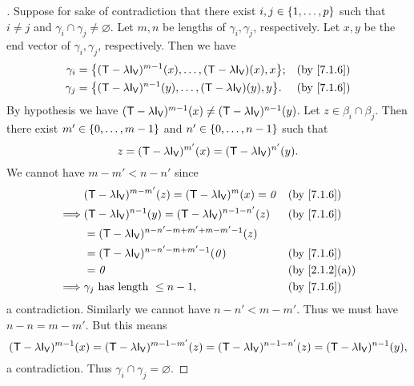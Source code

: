 \begin{proof}[]
  Suppose for sake of contradiction that there exist \(i, j \in \left\lbrace1, \dots, p\right\rbrace\) such that \(i \neq j\) and \(\gamma_i \cap \gamma_j \neq \varnothing\).
  Let \(m, n\) be lengths of \(\gamma_i, \gamma_j\), respectively.
  Let \(x, y\) be the end vector of \(\gamma_i, \gamma_j\), respectively.
  Then we have
  \begin{align*}
    \gamma_i & = \set{(\T - \lambda \IT[\V])^{m - 1}(x), \dots, (\T - \lambda \IT[\V])(x), x}; &  & \by{7.1.6} \\
    \gamma_j & = \set{(\T - \lambda \IT[\V])^{n - 1}(y), \dots, (\T - \lambda \IT[\V])(y), y}. &  & \by{7.1.6}
  \end{align*}
  By hypothesis we have \((\T - \lambda \IT[\V])^{m - 1}(x) \neq (\T - \lambda \IT[\V])^{n - 1}(y)\).
  Let \(z \in \beta_i \cap \beta_j\).
  Then there exist \(m' \in \left\lbrace0, \dots, m - 1\right\rbrace\) and \(n' \in \left\lbrace0, \dots, n - 1\right\rbrace\) such that
  \[
    z = (\T - \lambda \IT[\V])^{m'}(x) = (\T - \lambda \IT[\V])^{n'}(y).
  \]
  We cannot have \(m - m' < n - n'\) since
  \begin{align*}
             & (\T - \lambda \IT[\V])^{m - m'}(z) = (\T - \lambda \IT[\V])^m(x) = \zv     &  & \by{7.1.6}    \\
    \implies & (\T - \lambda \IT[\V])^{n - 1}(y) = (\T - \lambda \IT[\V])^{n - 1 - n'}(z) &  & \by{7.1.6}    \\
             & = (\T - \lambda \IT[\V])^{n - n' - m + m' + m - m' - 1}(z)                                    \\
             & = (\T - \lambda \IT[\V])^{n - n' - m + m' - 1}(\zv)                        &  & \by{7.1.6}    \\
             & = \zv                                                                      &  & \by{2.1.2}[a] \\
    \implies & \gamma_j \text{ has length } \leq n - 1,                                   &  & \by{7.1.6}
  \end{align*}
  a contradiction.
  Similarly we cannot have \(n - n' < m - m'\).
  Thus we must have \(n - n = m - m'\).
  But this means
  \[
    (\T - \lambda \IT[\V])^{m - 1}(x) = (\T - \lambda \IT[\V])^{m - 1 - m'}(z) = (\T - \lambda \IT[\V])^{n - 1 - n'}(z) = (\T - \lambda \IT[\V])^{n - 1}(y),
  \]
  a contradiction.
  Thus \(\gamma_i \cap \gamma_j = \varnothing\).
\end{proof}

